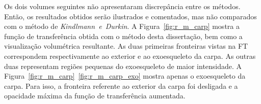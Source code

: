%	
%	

\newpage
	Os dois volumes seguintes não apresentaram discrepância entre os métodos. Então, os resultados obtidos serão ilustrados e comentados, mas não comparados com o método de \textit{Kindlmann~e~Durkin}.
\clearpage
	A Figura~\ref{fig:r_m_carp} mostra a função de transferência obtida com o método desta dissertação, bem como a visualização volumétrica resultante. As duas primeiras fronteiras vistas na FT correspondem respectivamente ao exterior e ao exoesqueleto da carpa. As outras duas representam regiões pequenas do exoesqueleto de maior intensidade. A Figura~\ref{fig:r_m_carp}~\ref{fig:r_m_carp_exo} mostra apenas o exoesqueleto da carpa. Para isso, a fronteira referente ao exterior da carpa foi desligada e a opacidade máxima da função de transferência aumentada.
	
